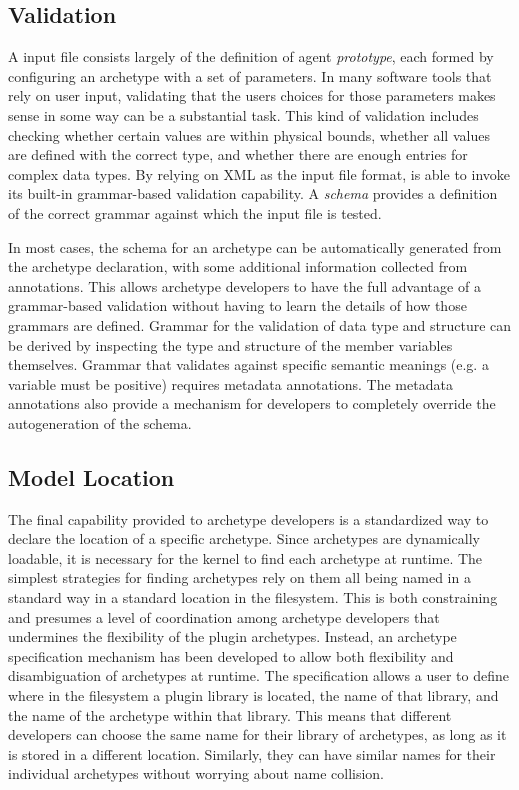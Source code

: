 \subsection{Validation}

A \Cyclus input file consists largely of the definition of agent
\textit{prototype}, each formed by configuring an archetype with a set of
parameters.  In many software tools that rely on user input, validating that
the users choices for those parameters makes sense in some way can be a
substantial task.  This kind of validation includes checking whether certain
values are within physical bounds, whether all values are defined with the
correct type, and whether there are enough entries for complex data types.  By
relying on \gls{XML} as the input file format, \Cyclus is able to invoke its
built-in grammar-based validation capability.  A \emph{schema} provides a
definition of the correct grammar against which the input file is tested.

In most cases, the schema for an archetype can be automatically generated from
the archetype declaration, with some additional information collected from
annotations.  This allows archetype developers to have the full advantage of a
grammar-based validation without having to learn the details of how those
grammars are defined.  Grammar for the validation of data type and structure
can be derived by inspecting the type and structure of the member variables
themselves.  Grammar that validates against specific semantic meanings (e.g. a
variable must be positive) requires metadata annotations.  The metadata
annotations also provide a mechanism for developers to completely override the
autogeneration of the schema.

\subsection{Model Location}\label{sec:model_location}

The final capability provided to archetype developers is a standardized way to
declare the location of a specific archetype.  Since archetypes are
dynamically loadable, it is necessary for the \Cyclus kernel to find each
archetype at runtime.  The simplest strategies for finding archetypes rely on
them all being named in a standard way in a standard location in the
filesystem.  This is both constraining and presumes a level of coordination
among archetype developers that undermines the flexibility of the plugin
archetypes.  Instead, an archetype specification mechanism has been developed
to allow both flexibility and disambiguation of archetypes at runtime.  The
specification allows a user to define where in the filesystem a plugin library
is located, the name of that library, and the name of the archetype within
that library.  This means that different developers can choose the same name
for their library of archetypes, as long as it is stored in a different
location.  Similarly, they can have similar names for their individual
archetypes without worrying about name collision.


